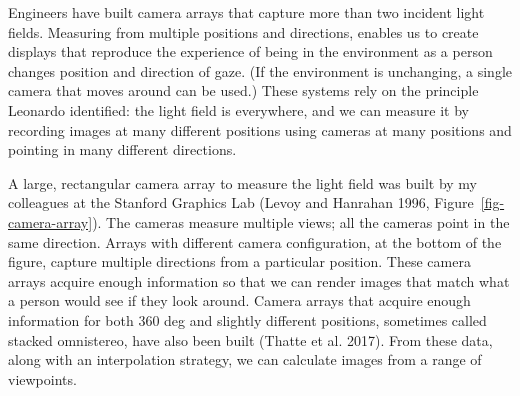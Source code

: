 \documentclass[
  letterpaper,
]{book}
\begin{document}
Engineers have built camera arrays that capture more than two incident
light fields. Measuring from multiple positions and directions, enables
us to create displays that reproduce the experience of being in the
environment as a person changes position and direction of gaze. (If the
environment is unchanging, a single camera that moves around can be
used.) These systems rely on the principle Leonardo identified: the
light field is everywhere, and we can measure it by recording images at
many different positions using cameras at many positions and pointing in
many different directions.

A large, rectangular camera array to measure the light field was built
by my colleagues at the Stanford Graphics Lab (Levoy and Hanrahan 1996,
Figure~\ref{fig-camera-array}). The cameras measure multiple views; all
the cameras point in the same direction. Arrays with different camera
configuration, at the bottom of the figure, capture multiple directions
from a particular position. These camera arrays acquire enough
information so that we can render images that match what a person would
see if they look around. Camera arrays that acquire enough information
for both 360 deg and slightly different positions, sometimes called
stacked omnistereo, have also been built (Thatte et al. 2017). From
these data, along with an interpolation strategy, we can calculate
images from a range of viewpoints.
\end{document}

